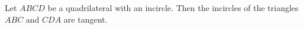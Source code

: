 Let $ABCD$ be a quadrilateral with an incircle. Then the incircles of the triangles $ABC$ and $CDA$ are tangent.
